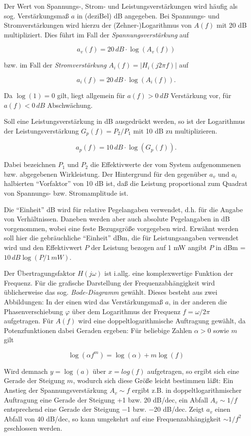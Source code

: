 \documentclass[
  ngerman,
  letterpaper,
]{scrbook}
\begin{document}
Der Wert von Spannungs-, Strom- und Leistungsverstärkungen wird häufig
als sog. Verstärkungsmaß \(a\) in (deziBel) dB angegeben. Bei Spannungs-
und Stromverstärkungen wird hierzu der (Zehner-)Logarithmus von \(A(f)\)
mit 20 dB multipliziert. Dies führt im Fall der
\emph{Spannungsverstärkung} auf

\[
a_v(f) = 20\,dB \cdot \log(A_v(f))
\]

bzw. im Fall der \emph{Stromverstärkung}
\(A_i(f) = \vert H_i(j2 \pi f)\vert\) auf

\[
a_i(f) = 20\,dB \cdot \log(A_i(f)).
\]

Da \(\log(1) = 0\) gilt, liegt allgemein für \(a(f) > 0\,dB\)
Verstärkung vor, für \(a(f) < 0\,dB\) Abschwächung.

Soll eine Leistungsverstärkung in dB ausgedrückt werden, so ist der
Logarithmus der Leistungsverstärkung \(G_p(f) = P_2/P_1\) mit 10 dB zu
multiplizieren.

\[
a_p(f) = 10\,dB \cdot \log(G_p(f)).
\]

Dabei bezeichnen \(P_1\) und \(P_2\) die Effektivwerte der vom System
aufgenommenen bzw. abgegebenen Wirkleistung. Der Hintergrund für den
gegenüber \(a_v\) und \(a_i\) halbierten ``Vorfaktor'' von 10 dB ist,
daß die Leistung proportional zum Quadrat von Spannungs- bzw.
Stromamplitude ist.

Die ``Einheit'' dB wird für relative Pegelangaben verwendet, d.h. für
die Angabe von Verhältnissen. Daneben werden aber auch absolute
Pegelangaben in dB vorgenommen, wobei eine feste Bezugsgröße vorgegeben
wird. Erwähnt werden soll hier die gebräuchliche ``Einheit'' dBm, die
für Leistungsangaben verwendet wird und den Effektivwert \(P\) der
Leistung bezogen auf 1 mW angibt \(P\) in dBm =
\(10\,dB \log(P/1\,mW)\).

Der Übertragungsfaktor \(H(j\omega)\) ist i.allg. eine komplexwertige
Funktion der Frequenz. Für die grafische Darstellung der
Frequenzabhängigkeit wird üblicherweise das sog. \emph{Bode-Diagramm}
gewählt. Dieses besteht aus zwei Abbildungen: In der einen wird das
Verstärkungsmaß \(a\), in der anderen die Phasenverschiebung \(\varphi\)
über dem Logarithmus der Frequenz \(f = \omega/2\pi\) aufgetragen. Für
\(A(f)\) wird eine doppeltlogarithmische Auftragung gewählt, da
Potenzfunktionen dabei Geraden ergeben: Für beliebige Zahlen
\(\alpha > 0\) sowie \(m\) gilt

\[
\log(\alpha f^m) = \log(\alpha) + m \log(f)
\]

Wird demnach \(y = \log(a)\) über \(x = log(f)\) aufgetragen, so ergibt
sich eine Gerade der Steigung \(m\), wodurch sich diese Größe leicht
bestimmen läßt: Ein Anstieg der Spannungsverstärkung \(A_v \sim f\)
ergibt z.B. in doppeltlogarithmischer Auftragung eine Gerade der
Steigung +1 bzw. 20 dB/dec, ein Abfall \(A_v \sim 1/f\) entsprechend
eine Gerade der Steigung −1 bzw. −20 dB/dec. Zeigt \(a_v\) einen Abfall
von 40 dB/dec, so kann umgekehrt auf eine Frequenzabhängigkeit
\(\sim 1/f^2\) geschlossen werden.
\end{document}
